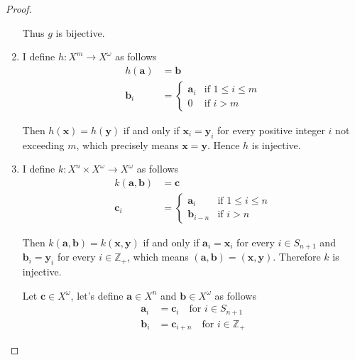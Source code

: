 \begin{proof}
\begin{enumerate}[label={(\alph*)}]
              Thus $g$ is bijective.
        \item I define $h: X^{m}\to X^{\omega}$ as follows
              \begin{align*}
                  h(\mathbf{a})  & = \mathbf{b}                                 \\
                  \mathbf{b}_{i} & = \begin{cases}
                                         \mathbf{a}_{i} & \text{if $1\leq i\leq m$} \\
                                         0              & \text{if $i > m$}
                                     \end{cases}
              \end{align*}

              Then $h(\mathbf{x}) = h(\mathbf{y})$ if and only if $\mathbf{x}_{i} = \mathbf{y}_{i}$ for every positive integer $i$ not exceeding $m$, which precisely means $\mathbf{x} = \mathbf{y}$. Hence $h$ is injective.
        \item I define $k: X^{n}\times X^{\omega}\to X^{\omega}$ as follows
              \begin{align*}
                  k(\mathbf{a}, \mathbf{b}) & = \mathbf{c}                                   \\
                  \mathbf{c}_{i}            & = \begin{cases}
                                                    \mathbf{a}_{i}   & \text{if $1\leq i\leq n$} \\
                                                    \mathbf{b}_{i-n} & \text{if $i > n$}
                                                \end{cases}
              \end{align*}

              Then $k(\mathbf{a}, \mathbf{b}) = k(\mathbf{x}, \mathbf{y})$ if and only if $\mathbf{a}_{i} = \mathbf{x}_{i}$ for every $i\in S_{n+1}$ and $\mathbf{b}_{i} = \mathbf{y}_{i}$ for every $i\in \mathbb{Z}_{+}$, which means $(\mathbf{a}, \mathbf{b}) = (\mathbf{x}, \mathbf{y})$. Therefore $k$ is injective.

              Let $\mathbf{c}\in X^{\omega}$, let's define $\mathbf{a}\in X^{n}$ and $\mathbf{b}\in X^{\omega}$ as follows
              \begin{align*}
                  \mathbf{a}_{i} & = \mathbf{c}_{i} \quad \text{for $i\in S_{n+1}$}         \\
                  \mathbf{b}_{i} & = \mathbf{c}_{i+n} \quad \text{for $i\in\mathbb{Z}_{+}$}
              \end{align*}


\end{enumerate}
\end{proof}
